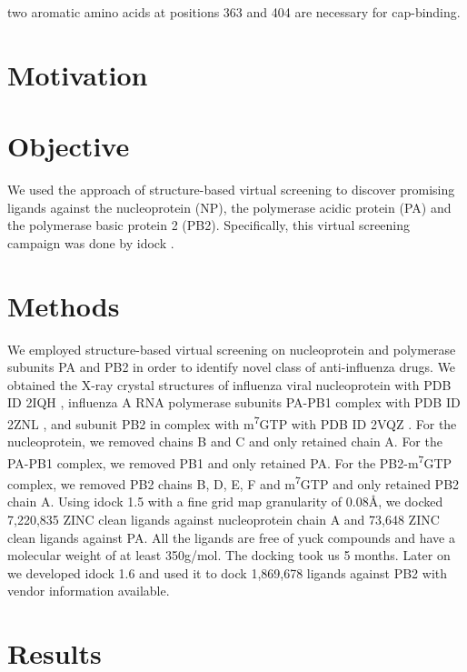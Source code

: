\citep{1192} two aromatic amino acids at positions 363 and 404 are necessary for cap-binding.


\section{Motivation}



\section{Objective}

We used the approach of structure-based virtual screening to discover promising ligands against the nucleoprotein (NP), the polymerase acidic protein (PA) and the polymerase basic protein 2 (PB2). Specifically, this virtual screening campaign was done by idock \citep{1153}.

\section{Methods}

We employed structure-based virtual screening on nucleoprotein and polymerase subunits PA and PB2 in order to identify novel class of anti-influenza drugs. We obtained the X-ray crystal structures of influenza viral nucleoprotein with PDB ID 2IQH \citep{1140}, influenza A RNA polymerase subunits PA-PB1 complex with PDB ID 2ZNL \citep{1141}, and subunit PB2 in complex with m\textsuperscript{7}GTP with PDB ID 2VQZ \citep{1192}. For the nucleoprotein, we removed chains B and C and only retained chain A. For the PA-PB1 complex, we removed PB1 and only retained PA. For the PB2-m\textsuperscript{7}GTP complex, we removed PB2 chains B, D, E, F and m\textsuperscript{7}GTP and only retained PB2 chain A. Using idock 1.5 with a fine grid map granularity of 0.08\AA, we docked 7,220,835 ZINC \citep{532} clean ligands against nucleoprotein chain A and 73,648 ZINC clean ligands against PA. All the ligands are free of yuck compounds and have a molecular weight of at least 350g/mol. The docking took us 5 months. Later on we developed idock 1.6 and used it to dock 1,869,678 ligands against PB2 with vendor information available.

\section{Results}

